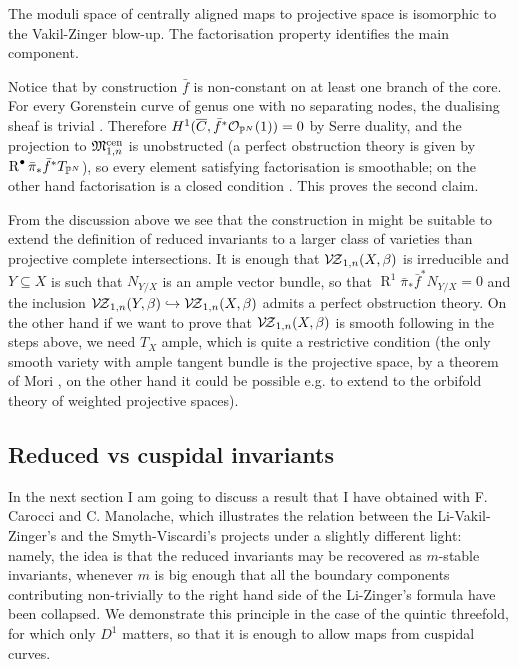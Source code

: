 \begin{thm}\cite[Theorems 4.6.3.2 and 4.5.1]{RSPW}
 The moduli space of centrally aligned maps to projective space is isomorphic to the Vakil-Zinger blow-up. The factorisation property identifies the main component.
\end{thm}
Notice that by construction $\bar{f}$ is non-constant on at least one branch of the core. For every Gorenstein curve of genus one with no separating nodes, the dualising sheaf is trivial \cite[Lemma 3.3]{SMY1}. Therefore $H^1(\overline{C},\bar{f}^*\mathcal{O}_{\mathbb P^N}(1))=0$ by Serre duality, and the projection to $\mathfrak M^{\mathrm{cen}}_{1,n}$ is unobstructed (a perfect obstruction theory is given by $\operatorname{R}^{\bullet}\bar{\pi}_*\bar{f}^*T_{\mathbb P^N}$), so every element satisfying factorisation is smoothable; on the other hand factorisation is a closed condition \cite[Theorem 4.3]{RSPW}. This proves the second claim.

\begin{rmk}
 From the discussion above we see that the construction in \cite{RSPW} might be suitable to extend the definition of reduced invariants to a larger class of varieties than projective complete intersections. It is enough that $\mathcal{V\!Z}_{1,n}(X,\beta)$ is irreducible and $Y\subseteq X$ is such that $N_{Y/X}$ is an ample vector bundle, so that $\operatorname R^1\bar{\pi}_*\bar{f}^*N_{Y/X}=0$ and the inclusion $\mathcal{V\!Z}_{1,n}(Y,\beta)\hookrightarrow\mathcal{V\!Z}_{1,n}(X,\beta)$ admits a perfect obstruction theory. On the other hand if we want to prove that $\mathcal{V\!Z}_{1,n}(X,\beta)$ is smooth following in the steps above, we need $T_X$ ample, which is quite a restrictive condition (the only smooth variety with ample tangent bundle is the projective space, by a theorem of Mori \cite{Mori}, on the other hand it could be possible e.g. to extend to the orbifold theory of weighted projective spaces).
\end{rmk}
\subsection{Reduced vs cuspidal invariants} In the next section I am going to discuss a result that I have obtained with F. Carocci and C. Manolache, which illustrates the relation between the Li-Vakil-Zinger's and the Smyth-Viscardi's projects under a slightly different light: namely, the idea is that the reduced invariants may be recovered as $m$-stable invariants, whenever $m$ is big enough that all the boundary components contributing non-trivially to the right hand side of the Li-Zinger's formula have been collapsed. We demonstrate this principle in the case of the quintic threefold, for which only $D^1$ matters, so that it is enough to allow maps from cuspidal curves.


